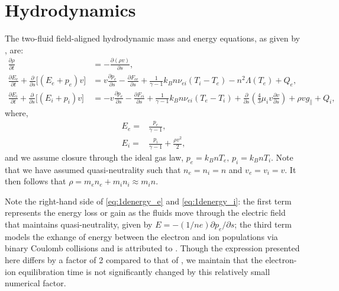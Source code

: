 
\section{Hydrodynamics}\label{sec:hydrodynamics}



The two-fluid field-aligned hydrodynamic mass and energy equations, as given by \citet{bradshaw_influence_2013}, are:
\begin{align}
    \frac{\partial\rho}{\partial t} &= -\frac{\partial(\rho v)}{\partial s}, \label{eq:1dmass} \\
    \frac{\partial E_e}{\partial t} + \frac{\partial}{\partial s} \lbrack(E_e+p_e)v\rbrack &= v\frac{\partial p_e}{\partial s} - \frac{\partial F_{ce}}{\partial s} + \frac{1}{\gamma - 1}k_Bn\nu_{ei}(T_i-T_e) -n^2\Lambda(T_e)+Q_{e} , \label{eq:1denergy_e} \\
    \frac{\partial E_i}{\partial t} + \frac{\partial }{\partial s}\lbrack(E_i+p_i)v\rbrack &= -v\frac{\partial p_e}{\partial s} - \frac{\partial F_{ci}}{\partial s} + \frac{1}{\gamma - 1}k_Bn\nu_{ei}(T_e-T_i) + \frac{\partial}{\partial s}\left(\frac{4}{3}\mu_iv\frac{\partial v}{\partial s}\right) +\rho v g_{\parallel} + Q_{i},\label{eq:1denergy_i}
\end{align}
where,
\begin{align}
    E_e =& \frac{p_e}{\gamma - 1} \label{eq:ee_closure}, \\
    E_i =& \frac{p_i}{\gamma - 1} + \frac{\rho v^2}{2}, \label{eq:ei_closure}
\end{align}
and we assume closure through the ideal gas law, $p_e=k_BnT_e,\,p_i=k_BnT_i$. Note that we have assumed quasi-neutrality such that $n_e=n_i=n$ and $v_e=v_i=v$. It then follows that $\rho=m_en_e+m_in_i\approx m_in$.

Note the right-hand side of \autoref{eq:1denergy_e} and \autoref{eq:1denergy_i}: the first term represents the energy loss or gain as the fluids move through the electric field that maintains quasi-neutrality, given by $E=-(1/ne)\partial p_e/\partial s$; the third term models the exhange of energy between the electron and ion populations via binary Coulomb collisions and is attributed to \citet{braginskii_transport_1965}. Though the expression presented here differs by a factor of 2 compared to that of \citeauthor{braginskii_transport_1965}, we maintain that the electron-ion equilibration time is not significantly changed by this relatively small numerical factor.

